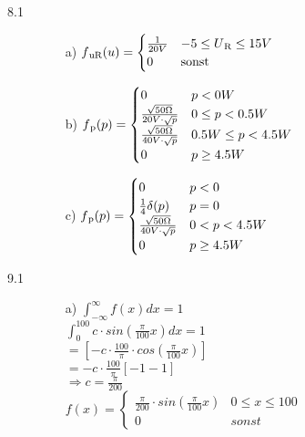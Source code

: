 \documentclass[a4paper]{article}
\begin{document}
\begin{description}
\item[8.1]
		\begin{itemize}
			\item[a)] $f\textsubscript{uR}(u)= \begin{cases}
																						\frac{1}{20V} & -5\leq U\textsubscript{R} \leq 15V\\
																						0 & \text{sonst}
																					\end{cases}$
																					
			\item[b)] $f\textsubscript{p}(p)= \begin{cases}
																						0 & p < 0W \\
																						\frac{\sqrt{50 \Omega}}{20V \cdot \sqrt{p}} & 0 \leq p < 0.5W\\
																						\frac{\sqrt{50 \Omega}}{40V \cdot \sqrt{p}} & 0.5W \leq p < 4.5W\\
																						0 & p\geq 4.5W
																					\end{cases}$\\
																					
			\item[c)] $f\textsubscript{p}(p)= \begin{cases}
																						0 & p < 0 \\
																						\frac{1}{4}\delta(p) & p=0\\
																						\frac{\sqrt{50 \Omega}}{40V \cdot \sqrt{p}} & 0<p<4.5W\\
																						0 & p\geq 4.5W
																					\end{cases}$\\
		\end{itemize}


\item[9.1]
		\begin{itemize}
			\item[a)] $\int_{-\infty}^{\infty} f(x)dx = 1$\\
			
								$\int_0^{100} c\cdot sin(\frac{\pi}{100}x)dx =1$\\
								$=[-c \cdot \frac{100}{\pi}\cdot cos(\frac{\pi}{100}x)]$\\
								$=-c\cdot \frac{100}{\pi}[-1-1]$\\
								$\Rightarrow c=\frac{\pi}{200}$\\
								
								$f(x)=\begin{cases}
												\frac{\pi}{200}\cdot sin(\frac{\pi}{100}x) & 0\leq x \leq 100\\
												0 & sonst
											\end{cases}$\\
			

\end{itemize}
\end{description}
\end{document}

